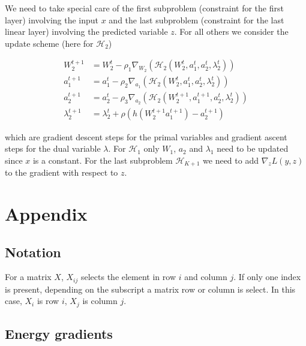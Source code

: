 \documentclass[english,11pt,a4paper]{article}
\begin{document}
We need to take special care of the first subproblem (constraint for the first layer) involving the input $x$ and the last subproblem (constraint for the last linear layer) involving the predicted variable $z$. For all others we consider the update scheme (here for $\mathcal{H}_2$)

\begin{equation}
	\begin{aligned}
		W_2^{t+1} &= W_2^t - \rho_1 \nabla_{W_2}(\mathcal{H}_2(W_2^t,a_1^t,a_2^t,\lambda_2^t)) \\
		a_1^{t+1} &= a_1^t - \rho_2 \nabla_{a_1}(\mathcal{H}_2(W_2^t,a_1^t,a_2^t,\lambda_2^t)) \\
		a_2^{t+1} &= a_2^t - \rho_3 \nabla_{a_2}(\mathcal{H}_2(W_2^{t+1},a_1^{t+1},a_2^t,\lambda_2^t)) \\
		\lambda_2^{t+1} &= \lambda_2^{t} + \rho (h(W_2^{t+1}a_1^{t+1})-a_2^{t+1})
	\end{aligned}
\end{equation}

which are gradient descent steps for the primal variables and gradient ascent steps for the dual variable $\lambda$. For $\mathcal{H}_1$ only $W_1$, $a_2$ and $\lambda_1$ need to be updated since $x$ is a constant. For the last subproblem $\mathcal{H}_{K+1}$ we need to add $\nabla_zL(y,z)$ to the gradient with respect to $z$.

\section{Appendix}

\subsection{Notation}

For a matrix $X$, $X_{ij}$ selects the element in row $i$ and column $j$. If only one index is present, depending on the subscript a matrix row or column is select. In this case, $X_i$ is row $i$, $X_j$ is column $j$.

\subsection{Energy gradients}
\end{document}
